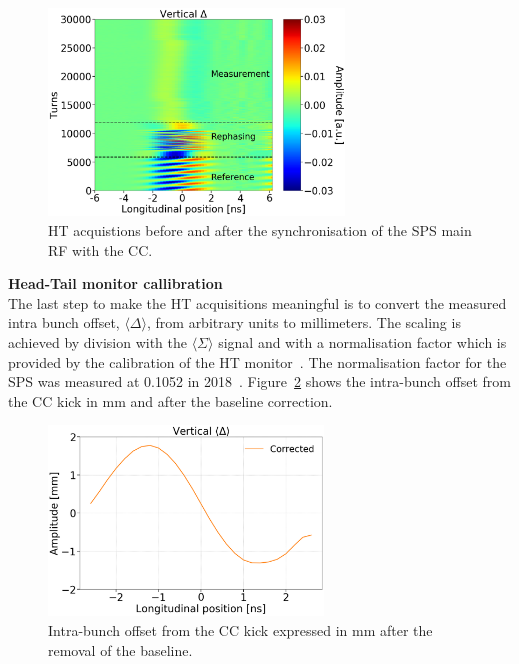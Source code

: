 \begin{figure}[!h]
   \centering         
   \includegraphics[width=0.7\textwidth]{images/Ch4/HT_2D__20180530_135105_before_after_sunchronisation_new_version.png}
       \caption{HT acquistions before and after the synchronisation of the SPS main RF with the CC.}
       \label{fig:HT_baseline_correction_measurements_2D}
\end{figure}


\normalsize{\textbf{Head-Tail monitor callibration}}\\
The last step to make the HT acquisitions meaningful is to convert the measured intra bunch offset, $\langle \Delta \rangle$, from arbitrary units to millimeters. The scaling is achieved by division with the $\langle \Sigma \rangle$ signal and with a normalisation factor which is provided by the calibration of the HT monitor~\cite{PhysRevAccelBeams.22.112803}. The normalisation factor for the SPS was measured at 0.1052 in 2018~\cite{HT_calibration_2018}. Figure~\ref{fig:HT_baseline_correction_crabbing_mm} shows the intra-bunch offset from the CC kick in mm and after the baseline correction. 


\begin{figure}[!h]
   \centering         
   \includegraphics[width=0.65\textwidth]{images/Ch4/HT_corrected__20180530_135105_baseline_correction_new_version.png}
       \caption{Intra-bunch offset from the CC kick expressed in mm after the removal of the baseline.}
       \label{fig:HT_baseline_correction_crabbing_mm}
\end{figure}




